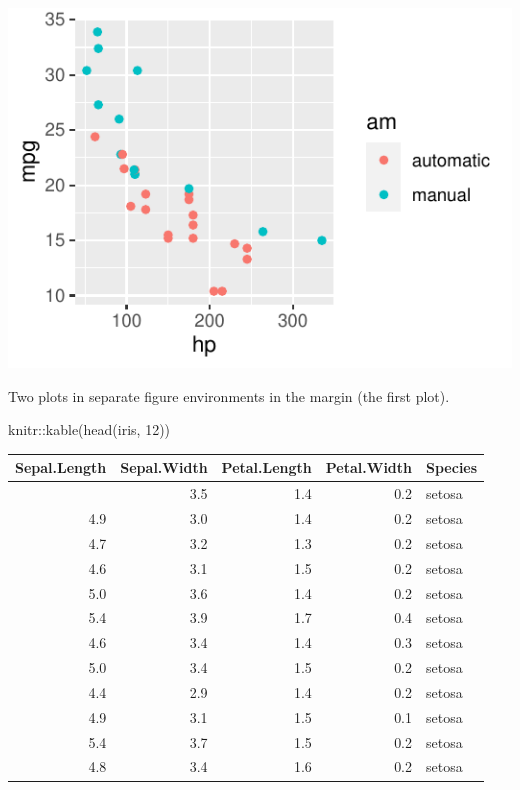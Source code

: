 \documentclass[]{tufte-handout}
\newenvironment{Shaded}{}{}
\newcommand{\DecValTok}[1]{\textcolor[rgb]{0.25,0.63,0.44}{#1}}
\newcommand{\FunctionTok}[1]{\textcolor[rgb]{0.02,0.16,0.49}{#1}}
\newcommand{\NormalTok}[1]{#1}
\newcommand{\SpecialCharTok}[1]{\textcolor[rgb]{0.25,0.44,0.63}{#1}}
\begin{document}
\begin{marginfigure}
\includegraphics{tufte_files/figure-latex/fig-margin-separate-1} \caption[Two plots in separate figure environments in the margin (the first plot)]{Two plots in separate figure environments in the margin (the first plot).}\label{fig:fig-margin-separate-1}
\end{marginfigure}

\begin{Shaded}
\begin{Highlighting}[]
\NormalTok{knitr}\SpecialCharTok{::}\FunctionTok{kable}\NormalTok{(}\FunctionTok{head}\NormalTok{(iris, }\DecValTok{12}\NormalTok{))}
\end{Highlighting}
\end{Shaded}

\begin{longtable}[]{@{}rrrrl@{}}
\toprule\noalign{}
Sepal.Length & Sepal.Width & Petal.Length & Petal.Width & Species \\
\midrule\noalign{}
\endhead
\bottomrule\noalign{}
\endlastfoot
5.1 & 3.5 & 1.4 & 0.2 & setosa \\
4.9 & 3.0 & 1.4 & 0.2 & setosa \\
4.7 & 3.2 & 1.3 & 0.2 & setosa \\
4.6 & 3.1 & 1.5 & 0.2 & setosa \\
5.0 & 3.6 & 1.4 & 0.2 & setosa \\
5.4 & 3.9 & 1.7 & 0.4 & setosa \\
4.6 & 3.4 & 1.4 & 0.3 & setosa \\
5.0 & 3.4 & 1.5 & 0.2 & setosa \\
4.4 & 2.9 & 1.4 & 0.2 & setosa \\
4.9 & 3.1 & 1.5 & 0.1 & setosa \\
5.4 & 3.7 & 1.5 & 0.2 & setosa \\
4.8 & 3.4 & 1.6 & 0.2 & setosa \\
\end{longtable}
\end{document}

